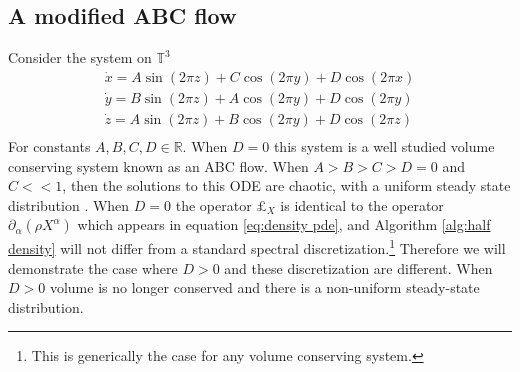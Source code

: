 \documentclass[final,leqno]{siamltex1213}
\begin{document}
%
%


\subsection{A modified ABC flow}
Consider the system on $\mathbb{T}^{3}$
\begin{align}
	\dot{x} = A \sin( 2\pi z) + C \cos(2\pi y)  + D \cos(2\pi x)\\
	\dot{y} = B \sin( 2\pi z) + A \cos(2\pi y)  + D \cos(2\pi y)\\
	\dot{z} = A \sin( 2\pi z) + B \cos(2\pi y)  + D \cos(2\pi z)\\
\end{align}
For constants $A,B,C,D \in \mathbb{R}$.  When $D=0$ this system is a well studied volume conserving system known as an ABC flow.
When $A > B > C > D = 0$ and $C << 1$, then the solutions to this ODE are chaotic, with a uniform steady state distribution \cite{MajdaBertozzi2002}.
When $D=0$ the operator $\pounds_{X}$ is identical to the operator $\partial_{\alpha}( \rho X^{\alpha})$ which appears in equation \eqref{eq:density pde},
and Algorithm \ref{alg:half density} will not differ from a standard spectral discretization.\footnote{This is generically the case for any volume conserving system.}
Therefore we will demonstrate the case where $D > 0$ and these discretization are different.
When $D> 0$ volume is no longer conserved and there is a non-uniform steady-state distribution.
\end{document}
